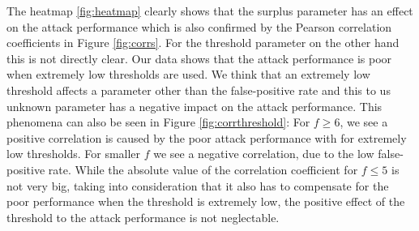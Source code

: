 The heatmap \ref{fig:heatmap} clearly shows that the surplus parameter has an effect on the attack performance which is also confirmed by the Pearson correlation coefficients in Figure \ref{fig:corrs}.
For the threshold parameter on the other hand this is not directly clear. Our data shows that the attack performance is poor when extremely low thresholds are used. We think that an extremely low threshold affects a parameter other than the false-positive rate and this to us unknown parameter has a negative impact on the attack performance.
This phenomena can also be seen in Figure \ref{fig:corrthreshold}: For $f \geq 6$, we see a positive correlation is caused by the poor attack performance with for extremely low thresholds. For smaller $f$ we see a negative correlation, due to the low  false-positive rate. While the absolute value of the correlation coefficient for $f \leq 5$  is not very big, taking into consideration that it also has to compensate for the poor performance when the threshold is extremely low, the positive effect of the threshold to the attack performance is not neglectable.

